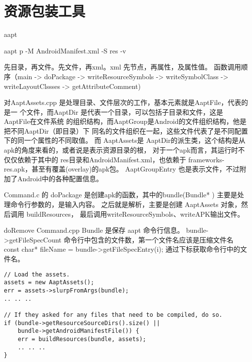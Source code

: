 \documentclass[a4paper,11pt]{article}
\begin{document}
\section{资源包装工具}
aapt

aapt p -M AndroidManifest.xml -S res -v

先目录，再文件。先文件，再xml。xml 先节点，再属性，及属性值。
函数调用顺序（main -> doPackage -> writeResourceSymbols -> writeSymbolClass ->
writeLayoutClssses -> getAttributeComment)

对AaptAssets.cpp 是处理目录、文件层次的工作，基本元素就是AaptFile，代表的是一
个文件，而AaptDir 是代表一个目录，可以包括子目录和文件，这是AaptFile在文件系统
的组织结构，而AaptGroup是Android的文件组织结构，他是把不同AaptDir（即目录）下
同名的文件组织在一起，这些文件代表了是不同配置下的同一个属性的不同取值。
而 AaptAssets是 AaptDir的派生类，这个结构是从apk的角度来看的，或者说是表示资源目录的根，
对于一个apk而言，其运行时不仅仅依赖于其中的 res目录和AndroidManifest.xml，也依赖于
frameworks-res.apk，甚至有覆盖(overlay)的apk包。
AaptGroupEntry 也是表示文件，不过附加了Android中的各种配置信息。

Command.c 的 doPackage 是创建apk的函数，其中的bundle(Bundle* )
主要是处理命令行参数的，是输入内容。
之后就是解析，主要是创建 AaptAssets 对象，然后调用 buildResources，
最后调用writeResourceSymbols、writeAPK输出文件。

doRemove Command.cpp
Bundle 是保存 aapt 命令行信息。
bundle->getFileSpecCount 命令行中包含的文件数，第一个文件名应该是压缩文件名
const char* fileName = bundle->getFileSpecEntry(i);
通过下标获取命令行中的文件名。


\begin{lstlisting}[caption=doPackage的核心代码,] 
// Load the assets.
assets = new AaptAssets();
err = assets->slurpFromArgs(bundle);
.. .. ..

// If they asked for any files that need to be compiled, do so.
if (bundle->getResourceSourceDirs().size() || 
    bundle->getAndroidManifestFile()) {
    err = buildResources(bundle, assets);
    .. .. ..
}
\end{lstlisting}
\end{document}
